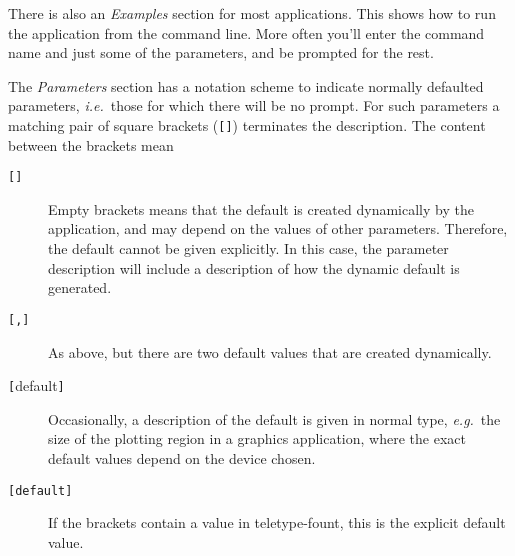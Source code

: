 \documentclass[11pt,nolof,noabs]{starlink}
\begin{document}
There is also an \emph{Examples\/} section for most applications.  This shows
how to run the application from the command line.  More often you'll enter the
command name and just some of the parameters, and be prompted for the rest.

The \emph{Parameters\/} section has a notation scheme to indicate
normally defaulted parameters, \textit{i.e.}\ those for which there will
be no prompt.
For such parameters a matching pair of square brackets (\texttt{[]})
terminates the description.  The content between the brackets mean
\begin{description}
\item[\texttt{[]}]
Empty brackets means that the default is created dynamically
by the application, and may depend on the values of other parameters.
Therefore, the default cannot be given explicitly. In this case, the parameter
description will include a description of how the dynamic default is generated.
\item[\texttt{[,]}]
As above, but there are two default values that are created dynamically.
\item[\texttt{[}{\rm default}\texttt{]}]
Occasionally, a description of the default is given in normal type,
\textit{e.g.}\ the size of the plotting region in a graphics application,
where the exact default values depend on the device chosen.
\item[\texttt{[default]}]
If the brackets contain a value in teletype-fount, this is the explicit
default value.
\end{description}
\end{document}
